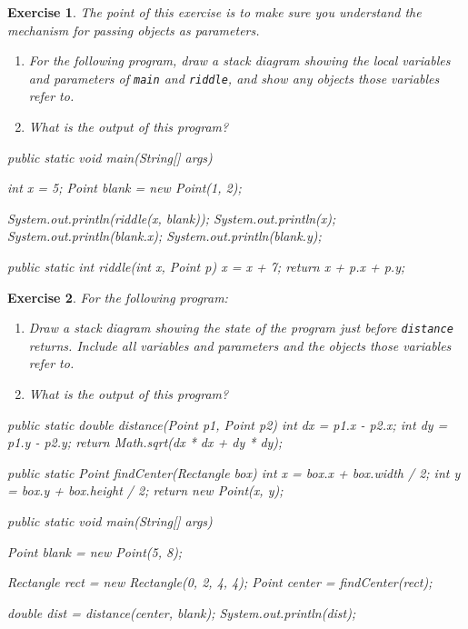 \documentclass[12pt]{book}
\theoremstyle{exercise}
\newtheorem{exercise}{Exercise}[chapter]
\newcommand{\java}[1]{\verb"#1"}
\newcommand{\java}[1]{\lstinline{#1}} %
\begin{document}
\begin{exercise}
The point of this exercise is to make sure you understand the mechanism for passing objects as parameters.

\begin{enumerate}

\item For the following program, draw a stack diagram showing the local variables and parameters of \java{main} and \java{riddle}, and show any objects those variables refer to.

\item What is the output of this program?

\end{enumerate}

\begin{code}
    public static void main(String[] args) {
        int x = 5;
        Point blank = new Point(1, 2);

        System.out.println(riddle(x, blank));
        System.out.println(x);
        System.out.println(blank.x);
        System.out.println(blank.y);
    }

    public static int riddle(int x, Point p) {
        x = x + 7;
        return x + p.x + p.y;
    }
\end{code}

\end{exercise}


\begin{exercise}
For the following program:

\begin{enumerate}

\item Draw a stack diagram showing the state of the program just before \java{distance} returns.
Include all variables and parameters and the objects those variables refer to.

\item What is the output of this program?

\end{enumerate}

\begin{code}
    public static double distance(Point p1, Point p2) {
        int dx = p1.x - p2.x;
        int dy = p1.y - p2.y;
        return Math.sqrt(dx * dx + dy * dy);
    }

    public static Point findCenter(Rectangle box) {
        int x = box.x + box.width / 2;
        int y = box.y + box.height / 2;
        return new Point(x, y);
    }
\end{code}

\begin{code}
    public static void main(String[] args) {
        Point blank = new Point(5, 8);

        Rectangle rect = new Rectangle(0, 2, 4, 4);
        Point center = findCenter(rect);

        double dist = distance(center, blank);
        System.out.println(dist);
    }
\end{code}

\end{exercise}
\end{document}
